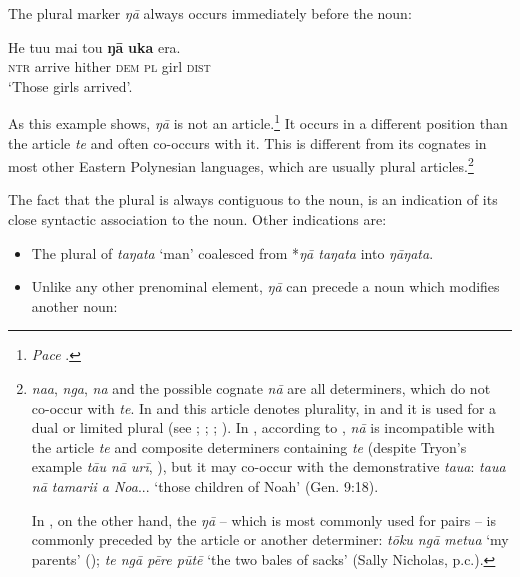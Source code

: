 The plural marker \textit{ŋā} always occurs immediately before the noun: 

\ea\label{ex:5.75}
\gll He tu{\ꞌ}u mai tou \textbf{ŋā} \textbf{uka} era. \\
\textsc{ntr} arrive hither \textsc{dem} \textsc{pl} girl \textsc{dist} \\

\glt
‘Those girls arrived’. \textstyleExampleref{[Blx-3.053]}
\z

As this example shows, \textit{ŋā} is not an article.\footnote{\label{fn:260}\textit{Pace} \citet[474]{DuFeu1987}.} It occurs in a different position than the article \textit{te} and often co-occurs with it. This is different from its cognates in most other Eastern Polynesian languages, which are usually plural articles.\footnote{\label{fn:261} \textit{naa},  \textit{nga},  \textit{na} and the possible cognate  \textit{nā} are all determiners, which do not co-occur with \textit{te}. In  and  this article denotes plurality, in  and  it is used for a dual or limited plural (see \citealt[19]{Elbert1976}; \citealt[20]{Biggs1973}; \citealt[11]{Zewen1987}; \citealt[16]{AcadémieTahitienne1986}). In , according to \citet[18]{AcadémieTahitienne1986}, \textit{nā} is incompatible with the article \textit{te} and composite determiners containing \textit{te} (despite Tryon’s example \textit{tā{\ꞌ}u nā {\ꞌ}urī}, \citet[17]{Tryon1970}), but it may co-occur with the demonstrative \textit{taua}: \textit{taua nā tamari{\ꞌ}i a Noa}... ‘those children of Noah’ (Gen. 9:18).

In , on the other hand, the  \textit{ŋā} – which is most commonly used for pairs – is commonly preceded by the article or another determiner: \textit{tōku ngā metua} ‘my parents’ (\citealt[405–406]{Buse1963Nominal}); \textit{te ngā pēre pūtē} ‘the two bales of sacks’ (Sally Nicholas, p.c.).}  

The fact that the plural is always contiguous to the noun, is an indication of its close syntactic association to the noun. Other indications are:

\begin{itemize}
\item 
The plural of \textit{taŋata} ‘man’ coalesced from *\textit{ŋā taŋata} into \textit{ŋāŋata}. 

\item 
Unlike any other prenominal element, \textit{ŋā} can precede a noun which modifies another noun:

\end{itemize}

